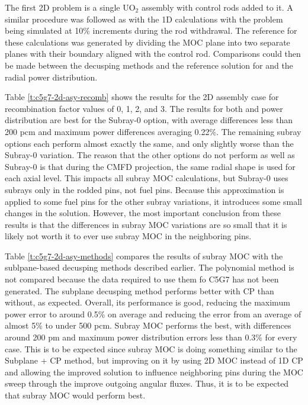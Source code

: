The first 2D problem is a single UO$_2$ assembly with control rods added to it.  A similar procedure was followed as with the 1D calculations with the problem being simulated at 10\% increments during the rod withdrawal.  The reference for these calculations was generated by dividing the MOC plane into two separate planes with their boundary aligned with the control rod.  Comparisons could then be made between the decusping methods and the reference solution for \keff{} and the radial power distribution.

Table \ref{t:c5g7-2d-asy-recomb} shows the results for the 2D assembly case for recombination factor values of 0, 1, 2, and 3.  The results for both \keff{} and power distribution are best for the Subray-0 option, with average \keff{} differences less than 200 pcm and maximum power differences averaging 0.22\%.  The remaining subray options each perform almost exactly the same, and only slightly worse than the Subray-0 variation.  The reason that the other options do not perform as well as Subray-0 is that during the CMFD projection, the same radial shape is used for each axial level.  This impacts all subray MOC calculations, but Subray-0 uses subrays only in the rodded pins, not fuel pins.  Because this approximation is applied to some fuel pins for the other subray variations, it introduces some small changes in the solution.  However, the most important conclusion from these results is that the differences in subray MOC variations are so small that it is likely not worth it to ever use subray MOC in the neighboring pins.

Table \ref{t:c5g7-2d-asy-methods} compares the results of subray MOC with the sublpane-based decusping methods described earlier.  The polynomial method is not compared because the data required to use them fo C5G7 has not been generated.  The subplane decusping method performs better with CP than without, as expected.  Overall, its performance is good, reducing the maximum power error to around 0.5\% on average and reducing the \keff{} error from an average of almost 5\% to under 500 pcm.  Subray MOC performs the best, with \keff{} differences around 200 pm and maximum power distribution errors less than 0.3\% for every case.  This is to be expected since subray MOC is doing something similar to the Subplane + CP method, but improving on it by using 2D MOC instead of 1D CP and allowing the improved solution to influence neighboring pins during the MOC sweep through the improve outgoing angular fluxes.  Thus, it is to be expected that subray MOC would perform best.

